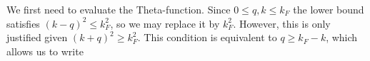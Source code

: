 \documentclass[english, parskip=full]{scrartcl}
\newcommand{\intx}{}
\newcommand{\kla}{}
\renewcommand{\i}{\text{i}}
\begin{document}
We first need to evaluate the Theta-function.
Since $0\le q,k\le k_F$ the lower bound satisfies $(k-q)^2 \le k_F^2$, so we may replace it by $k_F^2$.
However, this is only justified given $(k+q)^2 \ge k_F^2$.
This condition is equivalent to $q\ge k_F - k$, which allows us to write
\end{document}
